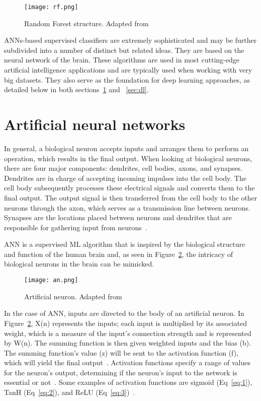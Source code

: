 \begin{figure}[htbp]
    \centering
    \texttt{[image: rf.png]}
    \caption{Random Forest structure. Adapted from~\cite{Sarker2021MachineDirections}}
    \label{fig:random_forest2}
\end{figure}

\gls{ANN}s-based supervised classifiers are extremely sophisticated and may be further subdivided into a number of distinct but related ideas. They are based on the neural network of the brain. These algorithms are used in most cutting-edge artificial intelligence applications and are typically used when working with very big datasets. They also serve as the foundation for deep learning approaches, as detailed below in both sections~\ref{sec:ann} and ~\ref{sec:dl}.

\section{Artificial neural networks}\label{sec:ann}

In general, a biological neuron accepts inputs and arranges them to perform an operation, which results in the final output. When looking at biological neurons, there are four major components: dendrites, cell bodies, axons, and synapses. Dendrites are in charge of accepting incoming impulses into the cell body. The cell body subsequently processes these electrical signals and converts them to the final output. The output signal is then transferred from the cell body to the other neurons through the axon, which serves as a transmission line between neurons. Synapses are the locations placed between neurons and dendrites that are responsible for gathering input from neurons~\cite{Imran2019AClassification}. 

\gls{ANN} is a supervised \gls{ML} algorithm that is inspired by the biological structure and function of the human brain and, as seen in Figure~\ref{fig:an}, the intricacy of biological neurons in the brain can be mimicked.

\begin{figure}[htbp]
    \centering
    \texttt{[image: an.png]}
    \caption{Artificial neuron. Adapted from~\cite{Baheti12Choose}}
    \label{fig:an}
\end{figure}

In the case of \gls{ANN}, inputs are directed to the body of an artificial neuron. In Figure~\ref{fig:an}, X(n) represents the inputs; each input is multiplied by its associated weight, which is a measure of the input's connection strength and is represented by W(n). The summing function is then given weighted inputs and the bias (b). The summing function's value (z) will be sent to the activation function (f), which will yield the final output~\cite{Imran2019AClassification}. Activation functions specify a range of values for the neuron's output, determining if the neuron's input to the network is essential or not~\cite{2020ArtificialNetworks}. Some examples of activation functions are sigmoid (Eq~\ref{eq:1}), TanH (Eq~\ref{eq:2}), and ReLU (Eq~\ref{eq:3})~\cite{EnyinnaNwankpa2018ActivationLearning}.

